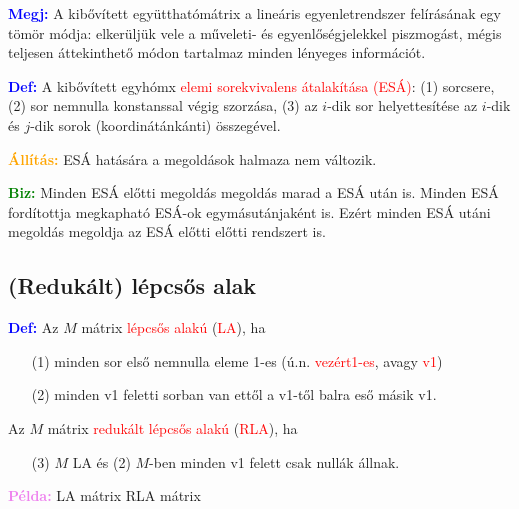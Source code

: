 \documentclass[../szamtud.tex]{subfiles}
\begin{document}
        \textcolor{blue}{\textbf{Megj:}} A kibővített együtthatómátrix a lineáris egyenletrendszer felírásának egy tömör módja: elkerüljük vele a műveleti- és egyenlőségjelekkel piszmogást, mégis teljesen áttekinthető módon tartalmaz minden lényeges információt.

        \textcolor{blue}{\textbf{Def:}} A kibővített egyhómx \textcolor{red}{elemi sorekvivalens átalakítása (ESÁ)}: (1) sorcsere, (2) sor nemnulla konstanssal végig szorzása, (3) az $i$-dik sor helyettesítése az $i$-dik és $j$-dik sorok (koordinátánkánti) összegével.
    
        \textcolor{orange}{\textbf{Állítás:}} ESÁ hatására a megoldások halmaza nem változik.

        \textcolor{green}{\textbf{Biz:}} Minden ESÁ előtti megoldás megoldás marad a ESÁ után is. Minden ESÁ fordítottja megkapható ESÁ-ok egymásutánjaként is. Ezért minden ESÁ utáni megoldás megoldja az ESÁ előtti előtti rendszert is.

    \subsection{(Redukált) lépcsős alak}
        
        \textcolor{blue}{\textbf{Def:}} Az $M$ mátrix \textcolor{red}{lépcsős alakú} (\textcolor{red}{LA}), ha \begin{itemize}
            \item[(1)] minden sor első nemnulla eleme 1-es (ú.n. \textcolor{red}{vezért1-es}, avagy \textcolor{red}{v1})
            \item[(2)] minden v1 feletti sorban van ettől a v1-től balra eső másik v1. 
        \end{itemize}

        Az $M$ mátrix \textcolor{red}{redukált lépcsős alakú} (\textcolor{red}{RLA}), ha \begin{itemize}
            \item[(3)] $M$ LA és (2) $M$-ben minden v1 felett csak nullák állnak.
        \end{itemize}

        \textcolor{violet}{\textbf{Példa:}} LA mátrix \hspace{30mm} RLA mátrix
\end{document}
